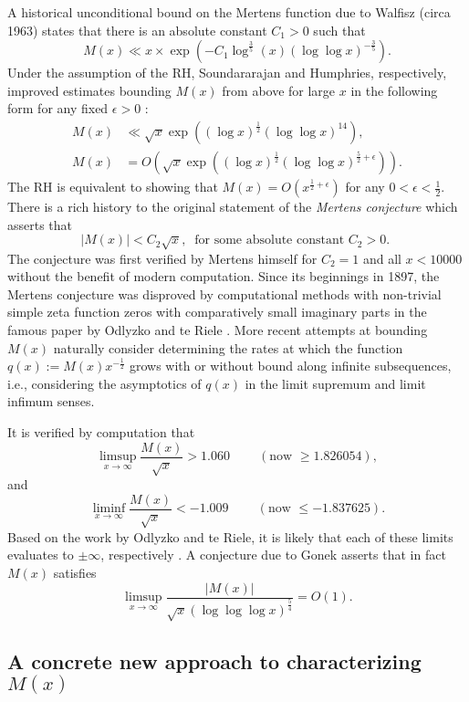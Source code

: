 \documentclass[11pt,reqno,a4letter]{article}
\numberwithin{figure}{section}
\numberwithin{table}{section}
\newcommand{\cf}{\textit{cf.\ }}
\newcommand{\seqnum}[1]{\href{http://oeis.org/#1}{\color{ProcessBlue}{\underline{#1}}}}
\theoremstyle{plain}
\numberwithin{theorem}{section}
\theoremstyle{definition}
\begin{document}
A historical unconditional bound on the Mertens function due to Walfisz (circa 1963) 
states that there is an absolute constant $C_1 > 0$ such that 
$$M(x) \ll x \times \exp\left(-C_1 \log^{\frac{3}{5}}(x) 
  (\log\log x)^{-\frac{3}{5}}\right).$$ 
Under the assumption of the RH, Soundararajan and Humphries, respectively, 
improved estimates bounding $M(x)$ from above for large $x$ in the 
following form for any fixed $\epsilon > 0$ 
\cite{SOUND-MERTENS-ANNALS,HUMPHRIES-JNT-2013}: 
\begin{align*} 
M(x) & \ll \sqrt{x} \exp\left((\log x)^{\frac{1}{2}} (\log\log x)^{14}\right), \\ 
M(x) & = O\left(\sqrt{x} \exp\left( 
     (\log x)^{\frac{1}{2}} (\log\log x)^{\frac{5}{2}+\epsilon}\right)\right). 
\end{align*} 
The RH is equivalent to showing that 
$M(x) = O\left(x^{\frac{1}{2}+\epsilon}\right)$ for any 
$0 < \epsilon < \frac{1}{2}$. 
There is a rich history to the original statement of the \emph{Mertens conjecture} which 
asserts that 
\[ 
|M(x)| < C_2 \sqrt{x},\ \text{ for some absolute constant $C_2 > 0$. }
\] 
The conjecture was first verified by Mertens himself for $C_2 = 1$ and all $x < 10000$ 
without the benefit of modern computation. 
Since its beginnings in 1897, the Mertens conjecture was disproved by computational methods with
non-trivial simple zeta function zeros with comparatively small imaginary parts in the famous paper by 
Odlyzko and te Riele \cite{ODLYZ-TRIELE}. 
More recent attempts 
at bounding $M(x)$ naturally consider determining the rates at which the function 
$q(x) := M(x) x^{-\frac{1}{2}}$ grows with or without bound along infinite 
subsequences, i.e., considering the asymptotics of $q(x)$ 
in the limit supremum and limit infimum senses. 

It is verified by computation 
that \cite[\cf \S 4.1]{PRIMEREC} 
\cite[\cf \seqnum{A051400}; \seqnum{A051401}]{OEIS} 
\[
\limsup_{x\rightarrow\infty} \frac{M(x)}{\sqrt{x}} > 1.060\ \qquad (\text{now } \geq 1.826054), 
\] 
and 
\[ 
\liminf_{x\rightarrow\infty} \frac{M(x)}{\sqrt{x}} < -1.009\ \qquad (\text{now } \leq -1.837625). 
\] 
Based on the work by Odlyzko and te Riele, it is likely that 
each of these limits evaluates to $\pm \infty$, respectively 
\cite{ODLYZ-TRIELE,MREVISITED,ORDER-MERTENSFN,HURST-2017}. 
A conjecture due to Gonek asserts that in fact 
$M(x)$ satisfies \cite{NG-MERTENS}
$$\limsup_{x \rightarrow \infty} \frac{|M(x)|}{\sqrt{x} (\log\log\log x)^{\frac{5}{4}}} = O(1).$$ 

\subsection{A concrete new approach to characterizing $M(x)$} 
\end{document}
